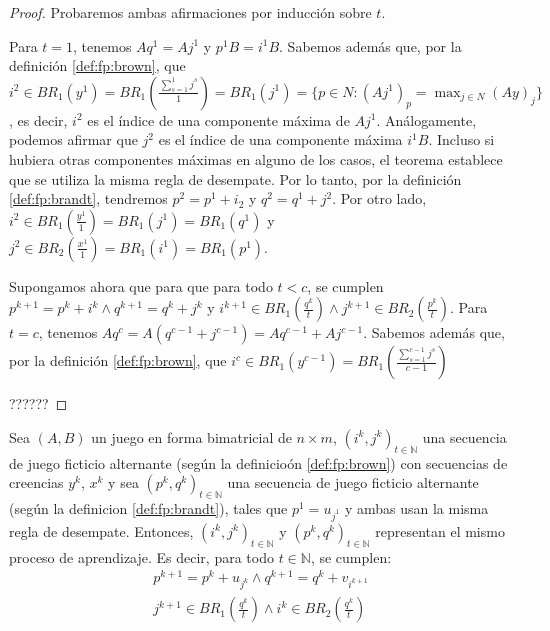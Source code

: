 \begin{proof}


    Probaremos ambas afirmaciones por inducción sobre $t$.

    Para $t = 1$, tenemos $Aq^1 = Aj^1$ y $p^1B = i^1B$. Sabemos además que, por la definición \ref{def:fp:brown}, que $i^{2} \in BR_1(y^1) = BR_1(\frac{\sum^1_{s=1} j^s}{1}) = BR_1(j^1) = \{p \in N : (Aj^1)_p = \max_{j \in N} (Ay)_j\}$, es decir, $i^2$ es el índice de una componente máxima de $Aj^1$. Análogamente, podemos afirmar que $j^2$ es el índice de una componente máxima $i^1B$. Incluso si hubiera otras componentes máximas en alguno de los casos, el teorema establece que se utiliza la misma regla de desempate. Por lo tanto, por la definición \ref{def:fp:brandt}, tendremos $p^2 = p^1 + i_2$ y $q^2 = q^1 + j^2$. Por otro lado, $i^{2} \in BR_1(\frac{y^1}{1}) = BR_1(j^1) = BR_1(q^1)$ y $j^{2} \in BR_2(\frac{x^1}{1}) = BR_1(i^1) = BR_1(p^1)$.

    Supongamos ahora que para que para todo $t < c$, se cumplen $p^{k+1} = p^{k} + i^k \land q^{k+1} = q^{k} + j^k$ y $i^{k+1} \in BR_1(\frac{q^k}{t}) \land j^{k+1} \in BR_2(\frac{p^k}{t})$. Para $t = c$, tenemos $Aq^c = A(q^{c-1} + j^{c-1}) = Aq^{c-1} + Aj^{c-1}$. Sabemos además que, por la definición \ref{def:fp:brown}, que $i^{c} \in BR_1(y^{c-1}) = BR_1(\frac{\sum^{c-1}_{s=1} j^s}{c-1})$

    ??????


\end{proof}

\begin{theorem}
    Sea $(A, B)$ un juego en forma bimatricial de $n \times m$, $(i^k, j^k)_{t \in \mathbb{N}}$ una secuencia de juego ficticio alternante (según la definicioón \ref{def:fp:brown}) con secuencias de creencias $y^k$, $x^k$ y sea $(p^k, q^k)_{t \in \mathbb{N}}$ una secuencia de juego ficticio alternante (según la definicion \ref{def:fp:brandt}), tales que $p^1 = u_{j^1}$ y ambas usan la misma regla de desempate. Entonces, $(i^k, j^k)_{t \in \mathbb{N}}$ y $(p^k, q^k)_{t \in \mathbb{N}}$ representan el mismo proceso de aprendizaje. Es decir, para todo $t \in \mathbb{N}$, se cumplen:
    \begin{gather}
        p^{k+1} = p^{k} + u_{j^k} \land q^{k+1} = q^{k} + v_{i^{k+1}} \\
        j^{k+1} \in BR_1(\frac{q^k}{t}) \land i^{k} \in BR_2(\frac{q^k}{t})
    \end{gather}
\end{theorem}

